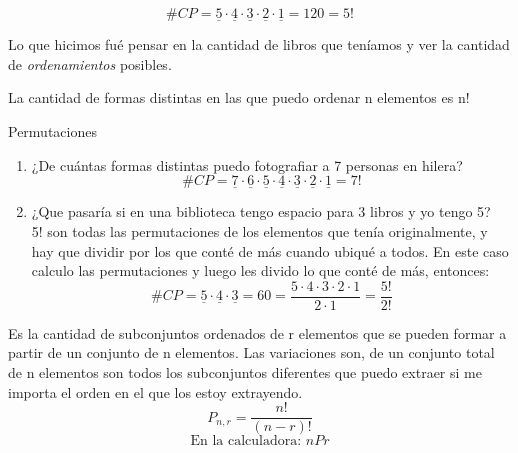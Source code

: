\documentclass[../main.tex]{subfiles}
\begin{document}
\begin{equation*}
    \#CP = \underline{5}\cdot\underline{4}\cdot\underline{3}\cdot\underline{2}\cdot\underline{1} = 120 = 5!
\end{equation*}

Lo que hicimos fué pensar en la cantidad de libros que teníamos y ver la cantidad de \textit{ordenamientos} posibles.

\begin{definition}[Permutaciones]
    La cantidad de formas distintas en las que puedo ordenar n elementos es n!
\end{definition}

\begin{defexamples} Permutaciones
    \begin{enumerate}
        \item ¿De cuántas formas distintas puedo fotografiar a 7 personas en hilera?
            \begin{equation*}
                \#CP = \underline{7}\cdot\underline{6}\cdot\underline{5}\cdot\underline{4}\cdot\underline{3}\cdot\underline{2}\cdot\underline{1} = 7!
            \end{equation*}
        \item ¿Que pasaría si en una biblioteca tengo espacio para 3 libros y yo tengo 5?\\
        5! son todas las permutaciones de los elementos que tenía originalmente, y hay que dividir por los que conté de más cuando ubiqué a todos. En este caso calculo las permutaciones y luego les divido lo que conté de más, entonces:
            \begin{equation*}
                \#CP = \underline{5}\cdot\underline{4}\cdot\underline{3} = 60 = \frac{5\cdot4\cdot3\cdot2\cdot1}{2\cdot1} = \frac{5!}{2!}
            \end{equation*}
    \end{enumerate}
\end{defexamples}

\begin{definition}[Variaciones]
    Es la cantidad de subconjuntos ordenados de r elementos que se pueden formar a partir de un conjunto de n elementos. Las variaciones son, de un conjunto total de n elementos son todos los subconjuntos diferentes que puedo extraer si me importa el orden en el que los estoy extrayendo.
    \begin{equation*}
        P_{n,r} = \frac{n!}{(n-r)!}
    \end{equation*}
    \begin{equation*}
        \text{En la calculadora: } \boxed{nPr}
    \end{equation*}
\end{definition}
\end{document}

